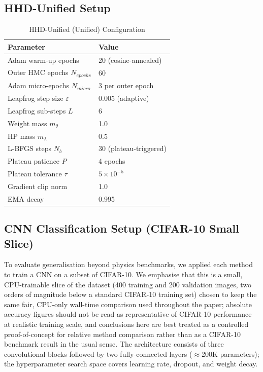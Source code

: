 \documentclass[11pt]{article}
\theoremstyle{definition}
\begin{document}
\subsection{HHD-Unified Setup}
\begin{table}[H]
\centering
\caption{HHD-Unified (Unified) Configuration}
\label{tab:setup_c}
\renewcommand{\arraystretch}{1.2}
\begin{tabular}{ll}
\toprule
Parameter & Value \\
\midrule
Adam warm-up epochs              & 20 (cosine-annealed) \\
Outer HMC epochs $N_{epochs}$   & 60 \\
Adam micro-epochs $N_{micro}$   & 3 per outer epoch \\
Leapfrog step size $\varepsilon$ & 0.005 (adaptive) \\
Leapfrog sub-steps $L$          & 6 \\
Weight mass $m_\theta$           & 1.0 \\
HP mass $m_\lambda$              & 0.5 \\
L-BFGS steps $N_b$               & 30 (plateau-triggered) \\
Plateau patience $P$             & 4 epochs \\
Plateau tolerance $\tau$         & $5 \times 10^{-5}$ \\
Gradient clip norm               & 1.0 \\
EMA decay                        & 0.995 \\
\bottomrule
\end{tabular}
\end{table}

\subsection{CNN Classification Setup (CIFAR-10 Small Slice)}

To evaluate generalisation beyond physics benchmarks, we applied
each method to train a CNN on a subset of CIFAR-10. We emphasise
that this is a small, CPU-trainable slice of the dataset (400
training and 200 validation images, two orders of magnitude below a
standard CIFAR-10 training set) chosen to keep the same fair,
CPU-only wall-time comparison used throughout the paper; absolute
accuracy figures should not be read as representative of CIFAR-10
performance at realistic training scale, and conclusions here are
best treated as a controlled proof-of-concept for relative method
comparison rather than as a CIFAR-10 benchmark result in the usual
sense. The architecture
consists of three convolutional blocks followed by two
fully-connected layers ($\approx$200K parameters); the hyperparameter
search space covers learning rate, dropout, and weight decay.
\end{document}
